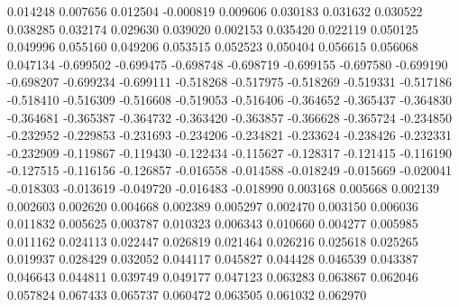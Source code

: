0.014248
0.007656
0.012504
-0.000819
0.009606
0.030183
0.031632
0.030522
0.038285
0.032174
0.029630
0.039020
0.002153
0.035420
0.022119
0.050125
0.049996
0.055160
0.049206
0.053515
0.052523
0.050404
0.056615
0.056068
0.047134
-0.699502
-0.699475
-0.698748
-0.698719
-0.699155
-0.697580
-0.699190
-0.698207
-0.699234
-0.699111
-0.518268
-0.517975
-0.518269
-0.519331
-0.517186
-0.518410
-0.516309
-0.516608
-0.519053
-0.516406
-0.364652
-0.365437
-0.364830
-0.364681
-0.365387
-0.364732
-0.363420
-0.363857
-0.366628
-0.365724
-0.234850
-0.232952
-0.229853
-0.231693
-0.234206
-0.234821
-0.233624
-0.238426
-0.232331
-0.232909
-0.119867
-0.119430
-0.122434
-0.115627
-0.128317
-0.121415
-0.116190
-0.127515
-0.116156
-0.126857
-0.016558
-0.014588
-0.018249
-0.015669
-0.020041
-0.018303
-0.013619
-0.049720
-0.016483
-0.018990
0.003168
0.005668
0.002139
0.002603
0.002620
0.004668
0.002389
0.005297
0.002470
0.003150
0.006036
0.011832
0.005625
0.003787
0.010323
0.006343
0.010660
0.004277
0.005985
0.011162
0.024113
0.022447
0.026819
0.021464
0.026216
0.025618
0.025265
0.019937
0.028429
0.032052
0.044117
0.045827
0.044428
0.046539
0.043387
0.046643
0.044811
0.039749
0.049177
0.047123
0.063283
0.063867
0.062046
0.057824
0.067433
0.065737
0.060472
0.063505
0.061032
0.062970
